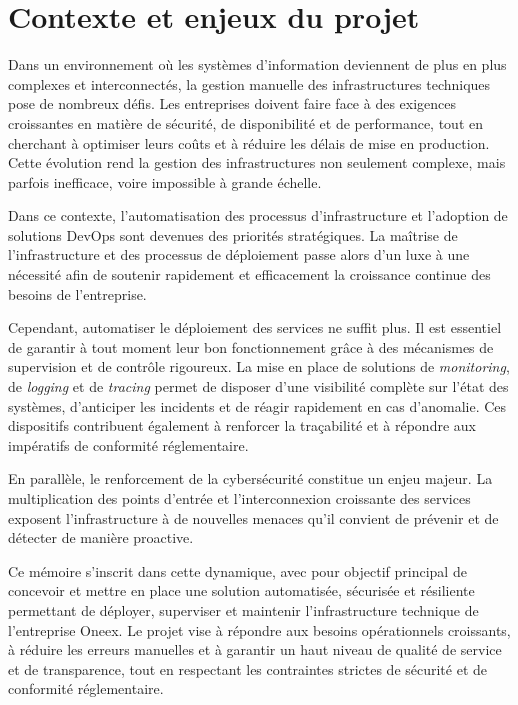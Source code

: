 \thispagestyle{mainmatter}

\section{Contexte et enjeux du projet}

Dans un environnement où les systèmes d'information deviennent de plus en plus complexes et interconnectés, la gestion manuelle des infrastructures techniques pose de nombreux défis. Les entreprises doivent faire face à des exigences croissantes en matière de sécurité, de disponibilité et de performance, tout en cherchant à optimiser leurs coûts et à réduire les délais de mise en production. Cette évolution rend la gestion des infrastructures non seulement complexe, mais parfois inefficace, voire impossible à grande échelle.

Dans ce contexte, l'automatisation des processus d'infrastructure et l'adoption de solutions DevOps sont devenues des priorités stratégiques. La maîtrise de l'infrastructure et des processus de déploiement passe alors d'un luxe à une nécessité afin de soutenir rapidement et efficacement la croissance continue des besoins de l'entreprise.

Cependant, automatiser le déploiement des services ne suffit plus. Il est essentiel de garantir à tout moment leur bon fonctionnement grâce à des mécanismes de supervision et de contrôle rigoureux. La mise en place de solutions de \emph{monitoring}, de \emph{logging} et de \emph{tracing} permet de disposer d'une visibilité complète sur l'état des systèmes, d'anticiper les incidents et de réagir rapidement en cas d'anomalie. Ces dispositifs contribuent également à renforcer la traçabilité et à répondre aux impératifs de conformité réglementaire.

En parallèle, le renforcement de la cybersécurité constitue un enjeu majeur. La multiplication des points d'entrée et l'interconnexion croissante des services exposent l'infrastructure à de nouvelles menaces qu'il convient de prévenir et de détecter de manière proactive.

Ce mémoire s'inscrit dans cette dynamique, avec pour objectif principal de concevoir et mettre en place une solution automatisée, sécurisée et résiliente permettant de déployer, superviser et maintenir l'infrastructure technique de l'entreprise Oneex. Le projet vise à répondre aux besoins opérationnels croissants, à réduire les erreurs manuelles et à garantir un haut niveau de qualité de service et de transparence, tout en respectant les contraintes strictes de sécurité et de conformité réglementaire.

